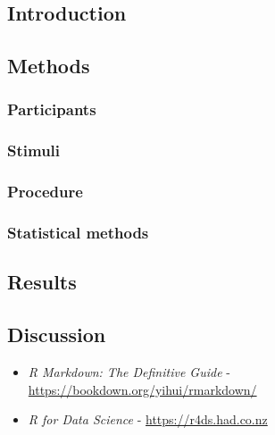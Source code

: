 \documentclass[a4paper, twoside]{templates/ociamthesis}
\begin{document}
\hypertarget{introduction-2}{%
\subsection{Introduction}\label{introduction-2}}

\hypertarget{methods-2}{%
\subsection{Methods}\label{methods-2}}

\hypertarget{participants-2}{%
\subsubsection{Participants}\label{participants-2}}

\hypertarget{stimuli-2}{%
\subsubsection{Stimuli}\label{stimuli-2}}

\hypertarget{procedure-2}{%
\subsubsection{Procedure}\label{procedure-2}}

\hypertarget{statistical-methods}{%
\subsubsection{Statistical methods}\label{statistical-methods}}

\hypertarget{results-2}{%
\subsection{Results}\label{results-2}}

\hypertarget{discussion-2}{%
\subsection{Discussion}\label{discussion-2}}

\begin{itemize}
\item
  \emph{R Markdown: The Definitive Guide} - \url{https://bookdown.org/yihui/rmarkdown/}
\item
  \emph{R for Data Science} - \url{https://r4ds.had.co.nz}
\end{itemize}
\end{document}
